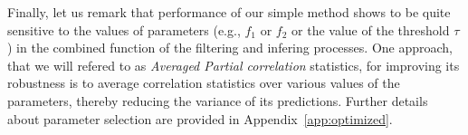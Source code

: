 \documentclass[wcp]{jmlr}
\begin{document}
Finally, let us remark that performance of our simple method shows to
be quite sensitive to the values of parameters (e.g., $f_1$ or $f_2$
or the value of the threshold $\tau$) in the combined function of the
filtering and infering processes. One approach, that we will refered
to as \textit{Averaged Partial correlation} statistics, for improving
its robustness is to average correlation statistics over various
values of the parameters, thereby reducing the variance of its
predictions. Further details about parameter selection are provided in
Appendix~\ref{app:optimized}.






\end{document}
